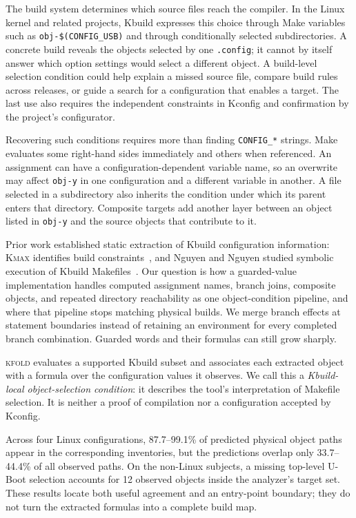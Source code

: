 \documentclass[acmsmall,screen,review]{acmart}
\newcommand{\tool}{\textsc{kfold}\xspace}
\begin{document}
The build system determines which source files reach the compiler. In the Linux kernel and related projects, Kbuild expresses this choice through Make variables such as \texttt{obj-\$(CONFIG\_USB)} and through conditionally selected subdirectories. A concrete build reveals the objects selected by one \texttt{.config}; it cannot by itself answer which option settings would select a different object. A build-level selection condition could help explain a missed source file, compare build rules across releases, or guide a search for a configuration that enables a target. The last use also requires the independent constraints in Kconfig and confirmation by the project's configurator.

Recovering such conditions requires more than finding \texttt{CONFIG\_*} strings. Make evaluates some right-hand sides immediately and others when referenced. An assignment can have a configuration-dependent variable name, so an overwrite may affect \texttt{obj-y} in one configuration and a different variable in another. A file selected in a subdirectory also inherits the condition under which its parent enters that directory. Composite targets add another layer between an object listed in \texttt{obj-y} and the source objects that contribute to it.

Prior work established static extraction of Kbuild configuration information: \textsc{Kmax} identifies build constraints~\cite{kmax,gazzillo2018localizing}, and Nguyen and Nguyen studied symbolic execution of Kbuild Makefiles~\cite{nguyen2020kbuild}. Our question is how a guarded-value implementation handles computed assignment names, branch joins, composite objects, and repeated directory reachability as one object-condition pipeline, and where that pipeline stops matching physical builds. We merge branch effects at statement boundaries instead of retaining an environment for every completed branch combination. Guarded words and their formulas can still grow sharply.

\tool evaluates a supported Kbuild subset and associates each extracted object with a formula over the configuration values it observes. We call this a \emph{Kbuild-local object-selection condition}: it describes the tool's interpretation of Makefile selection. It is neither a proof of compilation nor a configuration accepted by Kconfig.

Across four Linux configurations, 87.7--99.1\% of predicted physical object paths appear in the corresponding inventories, but the predictions overlap only 33.7--44.4\% of all observed paths. On the non-Linux subjects, a missing top-level U-Boot selection accounts for 12 observed objects inside the analyzer's target set. These results locate both useful agreement and an entry-point boundary; they do not turn the extracted formulas into a complete build map.
\end{document}
